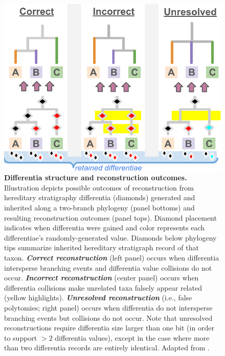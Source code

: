 \begin{figure}
  \centering
  \begin{minipage}{0.5\linewidth}
  \includegraphics[width=0.9\linewidth]{img/hstrat-failure-modes}
  \end{minipage}%
  \begin{minipage}{0.5\textwidth}
  \caption{%
    \textbf{Differentia structure and reconstruction outcomes.}
    \footnotesize
    Illustration depicts possible outcomes of reconstruction from hereditary stratigraphy differentia (diamonds) generated and inherited along a two-branch phylogeny (panel bottoms) and resulting reconstruction outcomes (panel tops).
    Diamond placement indicates when differentia were gained and color represents each differentiae's randomly-generated value.
    Diamonds below phylogeny tips summarize inherited hereditary stratigraph record of that taxon.
    \textbf{\textit{Correct reconstruction}} (left panel) occurs when differentia intersperse branching events and differentia value collisions do not occur.
    \textbf{\textit{Incorrect reconstruction}} (center panel) occurs when differentia collisions make unrelated taxa falsely appear related (yellow highlights).
    \textbf{\textit{Unresolved reconstruction}} (i.e., false polytomies; right panel) occurs when differentia do not intersperse branching events but collisions do not occur.
    Note that unresolved reconstructions require differentia size larger than one bit (in order to support $>2$ differentia values), except in the case where more than two differentia records are entirely identical.
    Adapted from \citep{moreno2025testing}.
  }
  \label{fig:hstrat-failure-modes}
  \end{minipage}
\end{figure}
